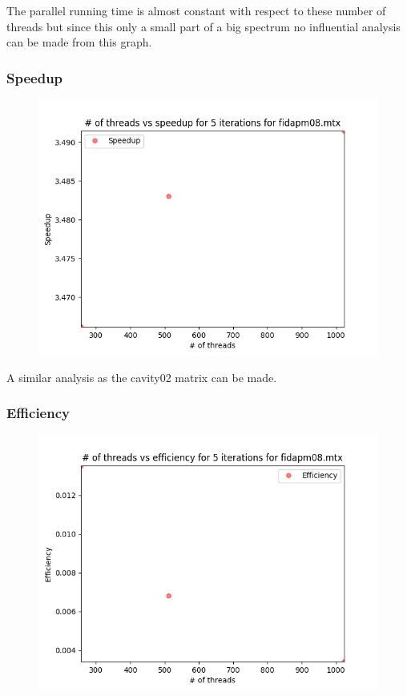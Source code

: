 \documentclass{article}
\begin{document}
\null \qquad The parallel running time is almost constant with respect to these number of threads but since this only a small part of a big spectrum no influential analysis can be made from this graph.

\subsubsection{Speedup}

\begin{figure}[H]
\centering
\includegraphics[width=\linewidth]{assets/fidapm08_thr_speedup.png}
\label{fig:test1}
\vspace{-2pt}
\end{figure}

\null \qquad A similar analysis as the cavity02 matrix can be made.

\subsubsection{Efficiency}

\begin{figure}[H]
\centering
\includegraphics[width=\linewidth]{assets/fidapm08_thr_eff.png}
\label{fig:test1}
\vspace{-2pt}
\end{figure}
\end{document}
